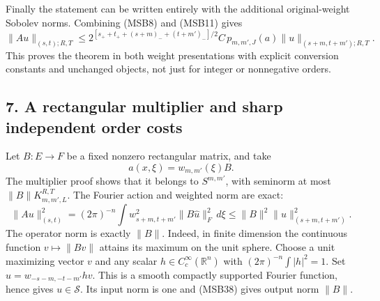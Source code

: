 \documentclass[
  11pt,
]{article}
\makeatletter
\let\ReaderOriginalAnchorStart\hyper@anchorstart
\let\ReaderOriginalAnchorEnd\hyper@anchorend
\let\ReaderPendingAliases\@empty
\def\ReaderArmAliases#1{\gdef\ReaderPendingAliases{#1}}
\def\hyper@anchorstart#1{\ReaderIfNativeAnchorTF{#1}{\ReaderPendingAliases\global\let\ReaderPendingAliases\@empty}{}\ReaderOriginalAnchorStart{#1}}
\makeatother
\begin{document}
Finally the statement can be written entirely with the additional
original-weight Sobolev norms. Combining (MSB8) and (MSB11) gives \[
 \|Au\|_{(s,t);R,T}
 \leq 2^{[s_++t_++(s+m)_-+(t+m')_-]/2}
 C\,p_{m,m',J}(a)\|u\|_{(s+m,t+m');R,T}.
 \tag{MSB36}
\] This proves the theorem in both weight presentations with explicit
conversion constants and unchanged objects, not just for integer or
nonnegative orders.

\ReaderArmAliases{\ReaderOriginalAnchorStart{AN03-MSB-007}\ReaderOriginalAnchorEnd\begingroup\expandafter\def\csname @currentHref\endcsname{AN03-MSB-007}\label{AN03-MSB-007}\endgroup\ReaderOriginalAnchorStart{an03-msb-007-a-rectangular-multiplier-and-sharp-independent-order-costs}\ReaderOriginalAnchorEnd\begingroup\expandafter\def\csname @currentHref\endcsname{an03-msb-007-a-rectangular-multiplier-and-sharp-independent-order-costs}\label{an03-msb-007-a-rectangular-multiplier-and-sharp-independent-order-costs}\endgroup\ReaderOriginalAnchorStart{7-a-rectangular-multiplier-and-sharp-independent-order-costs}\ReaderOriginalAnchorEnd\begingroup\expandafter\def\csname @currentHref\endcsname{7-a-rectangular-multiplier-and-sharp-independent-order-costs}\label{7-a-rectangular-multiplier-and-sharp-independent-order-costs}\endgroup}
\subsection{7. A rectangular multiplier and sharp independent order
costs}\label{a-rectangular-multiplier-and-sharp-independent-order-costs}

Let \(B:E\to F\) be a fixed nonzero rectangular matrix, and take \[
 a(x,\xi)=w_{m,m'}(\xi)B.
 \tag{MSB37}
\] The multiplier proof shows that it belongs to \(S^{m,m'}\), with
seminorm at most \(\|B\|K^{R,T}_{m,m',L}\). The Fourier action and
weighted norm are exact: \[
 \|Au\|_{(s,t)}^2
 =(2\pi)^{-n}\int w_{s+m,t+m'}^2\|B\widehat u\|_F^2\,d\xi
 \leq\|B\|^2\|u\|_{(s+m,t+m')}^2.
 \tag{MSB38}
\] The operator norm is exactly \(\|B\|\). Indeed, in finite dimension
the continuous function \(v\mapsto\|Bv\|\) attains its maximum on the
unit sphere. Choose a unit maximizing vector \(v\) and any scalar
\(h\in C_c^\infty(\mathbb R^n)\) with \((2\pi)^{-n}\int|h|^2=1\). Set
\(\widehat u=w_{-s-m,-t-m'}h v\). This is a smooth compactly supported
Fourier function, hence gives \(u\in\mathcal S\). Its input norm is one
and (MSB38) gives output norm \(\|B\|\).
\end{document}
